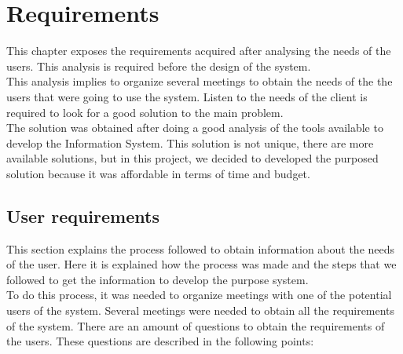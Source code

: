 
\chapter{Requirements}
\newpage

This chapter exposes the requirements acquired after analysing the needs of the users. This analysis is required before the design of the system.\\

This analysis implies to organize several meetings to obtain the needs of the the users that were going to use the system. Listen to the needs of the client is required to look for a good solution to the main problem.\\

The solution was obtained after doing a good analysis of the tools available to develop the Information System. This solution is not unique, there are more available solutions, but in this project, we decided to developed the purposed solution because it was affordable in terms of time and budget.

\section{User requirements}

This section explains the process followed to obtain information about the needs of the user. Here it is explained how the process was made and the steps that we followed to get the information to develop the purpose system.\\

To do this process, it was needed to organize meetings with one of the potential users of the system. Several meetings were needed to obtain all the requirements of the system. There are an amount of questions to obtain the requirements of the users. These questions are described in the following points:

